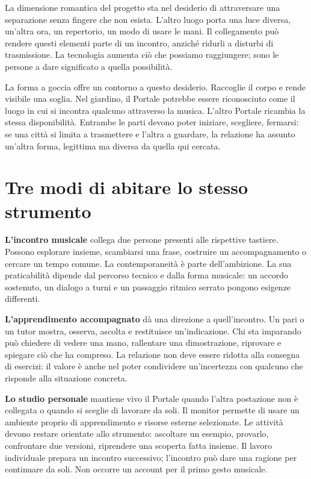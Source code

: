 La dimensione romantica del progetto sta nel desiderio di attraversare una separazione senza fingere che non esista. L'altro luogo porta una luce diversa, un'altra ora, un repertorio, un modo di usare le mani. Il collegamento può rendere questi elementi parte di un incontro, anziché ridurli a disturbi di trasmissione. La tecnologia aumenta ciò che possiamo raggiungere; sono le persone a dare significato a quella possibilità.

La forma a goccia offre un contorno a questo desiderio. Raccoglie il corpo e rende visibile una soglia. Nel giardino, il Portale potrebbe essere riconosciuto come il luogo in cui si incontra qualcuno attraverso la musica. L'altro Portale ricambia la stessa disponibilità. Entrambe le parti devono poter iniziare, scegliere, fermarsi: se una città si limita a trasmettere e l'altra a guardare, la relazione ha assunto un'altra forma, legittima ma diversa da quella qui cercata.

\section{Tre modi di abitare lo stesso strumento}
\textbf{L'incontro musicale} collega due persone presenti alle rispettive tastiere. Possono esplorare insieme, scambiarsi una frase, costruire un accompagnamento o cercare un tempo comune. La contemporaneità è parte dell'ambizione. La sua praticabilità dipende dal percorso tecnico e dalla forma musicale: un accordo sostenuto, un dialogo a turni e un passaggio ritmico serrato pongono esigenze differenti.

\textbf{L'apprendimento accompagnato} dà una direzione a quell'incontro. Un pari o un tutor mostra, osserva, ascolta e restituisce un'indicazione. Chi sta imparando può chiedere di vedere una mano, rallentare una dimostrazione, riprovare e spiegare ciò che ha compreso. La relazione non deve essere ridotta alla consegna di esercizi: il valore è anche nel poter condividere un'incertezza con qualcuno che risponde alla situazione concreta.

\textbf{Lo studio personale} mantiene vivo il Portale quando l'altra postazione non è collegata o quando si sceglie di lavorare da soli. Il monitor permette di usare un ambiente proprio di apprendimento e risorse esterne selezionate. Le attività devono restare orientate allo strumento: ascoltare un esempio, provarlo, confrontare due versioni, riprendere una scoperta fatta insieme. Il lavoro individuale prepara un incontro successivo; l'incontro può dare una ragione per continuare da soli. Non occorre un account per il primo gesto musicale.

